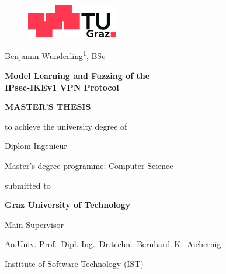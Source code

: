 \begin{titlepage}
\begin{center}
\begin{figure}[!ht]
\centerline{\includegraphics[width=4cm,keepaspectratio=true]{images/tug}}
\end{figure}	
	
\vspace*{28mm}

{\LARGE Benjamin Wunderling\textsuperscript{1}, BSc}\\

\vspace{16mm}

{\LARGE \bf  Model Learning and Fuzzing of the \\ IPsec-IKEv1 VPN Protocol\\}

\vspace{16mm}

{\Large \bf MASTER'S THESIS}\\

\vspace{6mm}

{\large to achieve the university degree of}

\vspace{4mm}

{\large Diplom-Ingenieur}

\vspace{4mm}

{\large Master's degree programme: Computer Science}

\vspace{16mm}

{\large submitted to}

\vspace{4mm}

{\large \bf Graz University of Technology}

\vspace{16mm}

{\large Main Supervisor}

{\large Ao.Univ.-Prof.\ Dipl.-Ing.\ Dr.techn.\ Bernhard\ K.\ Aichernig}

{\large Institute of Software Technology (IST)}

\vspace{8mm}


\end{center}
\end{titlepage}
